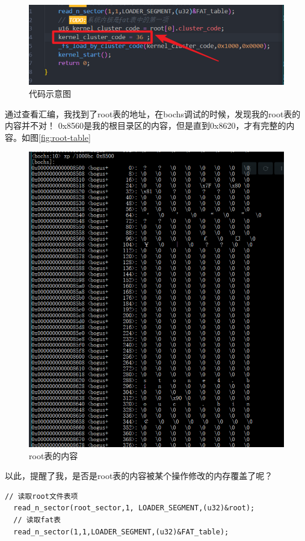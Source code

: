\documentclass[forprint]{WHUBachelor}
\begin{document}
\begin{figure}[htp]
  \centering
  \includegraphics[width=13cm]{"./figure/2018-04-17-10-13-22.png"}
  \caption{代码示意图}
  \label{fig:code-show}
\end{figure}

通过查看汇编，我找到了root表的地址，在bochs调试的时候，发现我的root表的内容并不对！
0x8560是我的根目录区的内容，但是直到0x8620，才有完整的内容。如图\autoref{fig:root-table}
\begin{figure}[htp]
  \centering
  \includegraphics[width=13cm]{"./figure/2018-04-17-10-17-48.png"}
  \caption{root表的内容}
  \label{fig:root-table}
\end{figure}

以此，提醒了我，是否是root表的内容被某个操作修改的内存覆盖了呢？
\begin{lstlisting}[language={[x86masm]Assembler}]
  // 读取root文件表项
  read_n_sector(root_sector,1, LOADER_SEGMENT,(u32)&root);
  // 读取fat表
  read_n_sector(1,1,LOADER_SEGMENT,(u32)&FAT_table);
\end{lstlisting}
\end{document}
